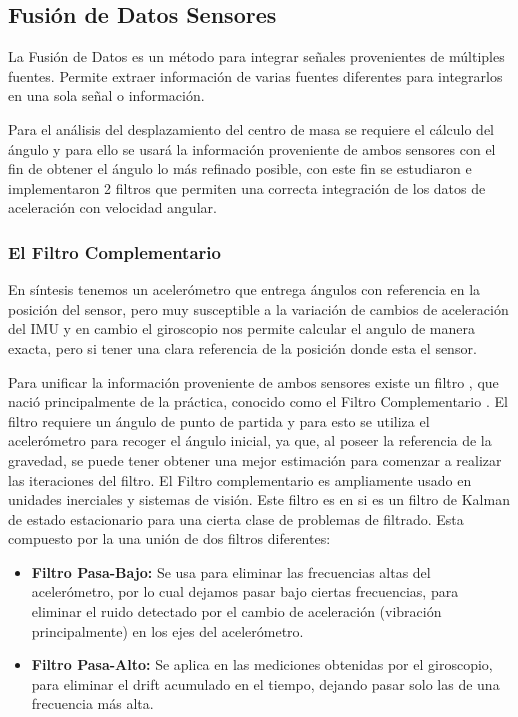 \documentclass[12pt,a4paper]{article}
\begin{document}
\subsection{Fusión de Datos Sensores}
La Fusión de Datos es un método para integrar señales provenientes de múltiples fuentes. Permite extraer información de varias fuentes diferentes para integrarlos en una sola señal o información.

Para el análisis del desplazamiento del centro de masa se requiere el cálculo del ángulo y para ello se usará la información proveniente de ambos sensores con el fin de obtener el ángulo lo más refinado posible, con este fin se estudiaron e implementaron 2 filtros que permiten una correcta integración de los datos de aceleración con velocidad angular.

\subsubsection{El Filtro Complementario}

En síntesis tenemos un acelerómetro que entrega ángulos con referencia en la posición del sensor, pero muy susceptible a la variación de cambios de aceleración del IMU y en cambio el giroscopio nos permite calcular el angulo de manera exacta, pero si tener una clara referencia de la posición donde esta el sensor. 

Para unificar la información proveniente de ambos sensores existe un filtro , que nació principalmente de la práctica, conocido como el Filtro Complementario \cite[Capítulo 3, p.~44]{TesisUSM}.
El filtro requiere un ángulo de punto de partida y para esto se utiliza el acelerómetro para recoger el ángulo inicial, ya que, al poseer la referencia de la gravedad, se puede tener obtener una mejor estimación para comenzar a realizar las iteraciones del filtro.
\newline
El Filtro complementario es ampliamente usado en unidades inerciales y sistemas de visión. Este filtro es en si es un filtro de Kalman de estado estacionario para una cierta clase de problemas de filtrado.
Esta compuesto por la una unión de dos filtros diferentes:
\begin{itemize}
	\item \textbf{Filtro Pasa-Bajo:} Se usa para eliminar las frecuencias altas del acelerómetro, por lo cual dejamos pasar bajo ciertas frecuencias, para eliminar el ruido detectado por el cambio de aceleración (vibración principalmente) en los ejes del acelerómetro.
	\item \textbf{Filtro Pasa-Alto:} Se aplica en las mediciones obtenidas por el giroscopio, para eliminar el drift acumulado en el tiempo, dejando pasar solo las de una frecuencia más alta.
\end{itemize}
\end{document}
